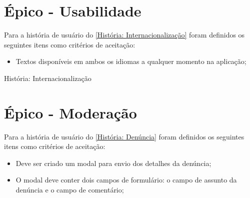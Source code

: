 \section{Épico - Usabilidade}
\label{gestão_usabilidade}
Para a história de usuário do \autoref{História: Internacionalização} foram definidos os seguintes itens como critérios de aceitação:

\begin{itemize}
\item  Textos disponíveis em ambos os idiomas a qualquer momento na aplicação;
\end{itemize}

\def\arraystretch{2}
\begin{quadro}[htb]
\centering
\ABNTEXfontereduzida
\caption[História: Internacionalização]{História: Internacionalização}
\label{História: Internacionalização}
\end{quadro}
\FloatBarrier 

\section{Épico - Moderação}
\label{gestão_moderacao}
Para a história de usuário do \autoref{História: Denúncia} foram definidos os seguintes itens como critérios de aceitação:

\begin{itemize}
\item Deve ser criado um modal para envio dos detalhes da denúncia;
\item O modal deve conter dois campos de formulário: o campo de assunto da denúncia e o campo de comentário; 
\end{itemize}

